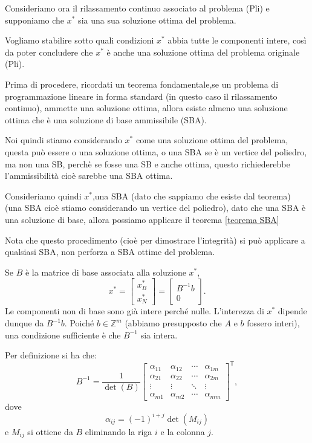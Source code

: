 Consideriamo ora il rilassamento continuo associato al problema (Pli) e supponiamo che \(x^*\) sia una sua soluzione ottima del problema.

Vogliamo stabilire sotto quali condizioni \(x^*\) abbia tutte le componenti intere, così da poter concludere che \(x^*\) è anche una soluzione ottima del problema originale (Pli).

\begin{warning}{}
  Prima di procedere, ricordati un teorema fondamentale,se un problema di programmazione lineare in forma standard (in questo caso il rilassamento continuo),
  ammette una soluzione ottima, allora esiste almeno una soluzione ottima che è una soluzione di base ammissibile (SBA).
\end{warning}

Noi quindi stiamo considerando $x^*$ come una soluzione ottima del problema, questa può essere o una soluzione ottima, o una SBA se è un vertice del poliedro, ma non una SB, perchè se fosse una SB e anche ottima, questo richiederebbe l'ammissibilità cioè sarebbe una SBA ottima.


Consideriamo quindi $x^*$,una SBA (dato che sappiamo che esiste dal teorema) (una SBA cioè stiamo considerando un vertice del poliedro), dato che una SBA è una soluzione di base, allora possiamo applicare il teorema \ref{teorema SBA}

\begin{warning}{}
  Nota che questo procedimento (cioè per dimostrare l'integrità) si può applicare a qualsiasi SBA, non perforza a SBA ottime del problema.
\end{warning}

Se \(B\) è la matrice di base associata alla soluzione $x^*$,
\[
x^*=
\begin{bmatrix}x_B^*\\x_N^*\end{bmatrix}
=
\begin{bmatrix}B^{-1}b\\0\end{bmatrix}.
\]
Le componenti non di base sono già intere perché nulle.
L'interezza di \(x^*\) dipende dunque da \(B^{-1}b\).
Poiché \(b\in\mathbb Z^m\) (abbiamo presupposto che $A$ e $b$ fossero interi), una condizione sufficiente è che
\(B^{-1}\) sia intera.

Per definizione si ha che:
\[
B^{-1}
=\frac{1}{\det(B)}
\begin{bmatrix}
\alpha_{11}&\alpha_{12}&\cdots&\alpha_{1m}\\
\alpha_{21}&\alpha_{22}&\cdots&\alpha_{2m}\\
\vdots&\vdots&\ddots&\vdots\\
\alpha_{m1}&\alpha_{m2}&\cdots&\alpha_{mm}
\end{bmatrix}^{\mathsf T},
\]
dove
\[
\alpha_{ij}=(-1)^{i+j}\det(M_{ij})
\]
e \(M_{ij}\) si ottiene da \(B\) eliminando la riga \(i\)
e la colonna \(j\).

